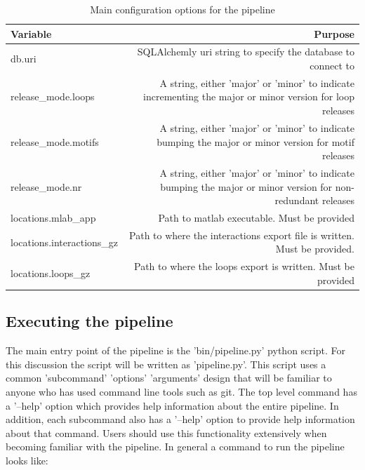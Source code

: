 \begin{table}[ht]
\begin{tabulary}{\linewidth}{LR}
\toprule
Variable & Purpose \\
\midrule

db.uri & SQLAlchemly uri string to specify the database to connect to \\

release\_mode.loops & A string, either 'major' or 'minor' to indicate
                        incrementing the major or minor version for loop releases \\

release\_mode.motifs & A string, either 'major' or 'minor' to indicate bumping
                        the major or minor version for motif releases \\

release\_mode.nr & A string, either 'major' or 'minor' to indicate bumping the
                   major or minor version for non- redundant releases \\

locations.mlab\_app & Path to matlab executable. Must be provided  \\

locations.interactions\_gz & Path to where the interactions export file is
                             written. Must be provided. \\

locations.loops\_gz & Path to where the loops export is written. Must be
                      provided \\

\bottomrule
\end{tabulary}
\caption{Main configuration options for the pipeline}
\label{tab:pipeline-config}
\end{table}

\subsection{Executing the pipeline}

The main entry point of the pipeline is the 'bin/pipeline.py' python script. For
this discussion the script will be written as 'pipeline.py'. This script uses a
common 'subcommand' 'options' 'arguments' design that will be familiar to anyone
who has used command line tools such as git. The top level command has a
'--help' option which provides help information about the entire pipeline. In
addition, each subcommand also has a '--help' option to provide help information
about that command. Users should use this functionality extensively when
becoming familiar with the pipeline. In general a command to run the pipeline
looks like:

